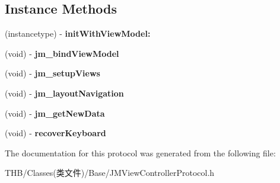 \subsection*{Instance Methods}
\begin{DoxyCompactItemize}
\item 
\mbox{\label{protocol_j_m_view_controller_protocol_01-p_a450b0502dc2ce7d417c3e7040b36fdbe}} 
(instancetype) -\/ {\bfseries init\+With\+View\+Model\+:}
\item 
\mbox{\label{protocol_j_m_view_controller_protocol_01-p_a928d34206539b2c578897740d37f9ba5}} 
(void) -\/ {\bfseries jm\+\_\+bind\+View\+Model}
\item 
\mbox{\label{protocol_j_m_view_controller_protocol_01-p_ad7d42a83714f143d006e26fe5426a4b5}} 
(void) -\/ {\bfseries jm\+\_\+setup\+Views}
\item 
\mbox{\label{protocol_j_m_view_controller_protocol_01-p_a063d9ba7ebb560a613aa42ad5d82bf25}} 
(void) -\/ {\bfseries jm\+\_\+layout\+Navigation}
\item 
\mbox{\label{protocol_j_m_view_controller_protocol_01-p_a443150f171223df66b7c3260a5446841}} 
(void) -\/ {\bfseries jm\+\_\+get\+New\+Data}
\item 
\mbox{\label{protocol_j_m_view_controller_protocol_01-p_a4c40a25dcbcd4ed29b078010767ef6a1}} 
(void) -\/ {\bfseries recover\+Keyboard}
\end{DoxyCompactItemize}


The documentation for this protocol was generated from the following file\+:\begin{DoxyCompactItemize}
\item 
T\+H\+B/\+Classes(类文件)/\+Base/J\+M\+View\+Controller\+Protocol.\+h\end{DoxyCompactItemize}
